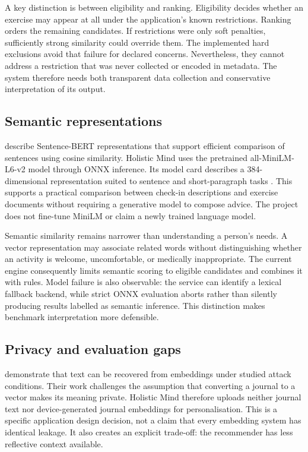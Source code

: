 A key distinction is between eligibility and ranking. Eligibility decides whether an exercise may appear at all under the application's known restrictions. Ranking orders the remaining candidates. If restrictions were only soft penalties, sufficiently strong similarity could override them. The implemented hard exclusions avoid that failure for declared concerns. Nevertheless, they cannot address a restriction that was never collected or encoded in metadata. The system therefore needs both transparent data collection and conservative interpretation of its output.

\subsection{Semantic representations}

\citet{reimers2019} describe Sentence-BERT representations that support efficient comparison of sentences using cosine similarity. Holistic Mind uses the pretrained all-MiniLM-L6-v2 model through ONNX inference. Its model card describes a 384-dimensional representation suited to sentence and short-paragraph tasks \citep{minilm}. This supports a practical comparison between check-in descriptions and exercise documents without requiring a generative model to compose advice. The project does not fine-tune MiniLM or claim a newly trained language model.

Semantic similarity remains narrower than understanding a person's needs. A vector representation may associate related words without distinguishing whether an activity is welcome, uncomfortable, or medically inappropriate. The current engine consequently limits semantic scoring to eligible candidates and combines it with rules. Model failure is also observable: the service can identify a lexical fallback backend, while strict ONNX evaluation aborts rather than silently producing results labelled as semantic inference. This distinction makes benchmark interpretation more defensible.

\subsection{Privacy and evaluation gaps}

\citet{morris2023} demonstrate that text can be recovered from embeddings under studied attack conditions. Their work challenges the assumption that converting a journal to a vector makes its meaning private. Holistic Mind therefore uploads neither journal text nor device-generated journal embeddings for personalisation. This is a specific application design decision, not a claim that every embedding system has identical leakage. It also creates an explicit trade-off: the recommender has less reflective context available.

